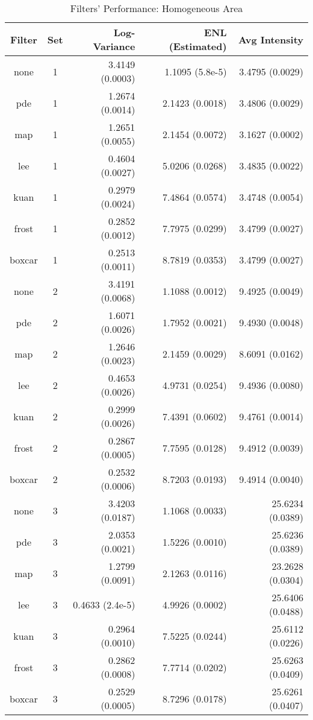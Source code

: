 \documentclass[journal]{IEEEtran}
\begin{document}
\begin{table}
\centering
\begin{tabular}{c|c|r|r|r}
Filter & Set & Log-Variance & ENL (Estimated) & Avg Intensity \\
\hline
none & 1 & 3.4149 (0.0003) & 1.1095 (5.8e-5) & 3.4795 (0.0029)\\
pde & 1 & 1.2674 (0.0014) & 2.1423 (0.0018) & 3.4806 (0.0029)\\
map & 1 & 1.2651 (0.0055) & 2.1454 (0.0072) & 3.1627 (0.0002)\\
lee & 1 & 0.4604 (0.0027) & 5.0206 (0.0268) & 3.4835 (0.0022)\\
kuan & 1 & 0.2979 (0.0024) & 7.4864 (0.0574) & 3.4748 (0.0054)\\
frost & 1 & 0.2852 (0.0012) & 7.7975 (0.0299) & 3.4799 (0.0027)\\
boxcar & 1 & 0.2513 (0.0011) & 8.7819 (0.0353) & 3.4799 (0.0027)\\
\hline
none & 2 & 3.4191 (0.0068) & 1.1088 (0.0012) & 9.4925 (0.0049)\\
pde & 2 & 1.6071 (0.0026) & 1.7952 (0.0021) & 9.4930 (0.0048)\\
map & 2 & 1.2646 (0.0023) & 2.1459 (0.0029) & 8.6091 (0.0162)\\
lee & 2 & 0.4653 (0.0026) & 4.9731 (0.0254) & 9.4936 (0.0080)\\
kuan & 2 & 0.2999 (0.0026) & 7.4391 (0.0602) & 9.4761 (0.0014)\\
frost & 2 & 0.2867 (0.0005) & 7.7595 (0.0128) & 9.4912 (0.0039)\\
boxcar & 2 & 0.2532 (0.0006) & 8.7203 (0.0193) & 9.4914 (0.0040)\\
\hline
none & 3 & 3.4203 (0.0187) & 1.1068 (0.0033) & 25.6234 (0.0389)\\
pde & 3 & 2.0353 (0.0021) & 1.5226 (0.0010) & 25.6236 (0.0389)\\
map & 3 & 1.2799 (0.0091) & 2.1263 (0.0116) & 23.2628 (0.0304)\\
lee & 3 & 0.4633 (2.4e-5) & 4.9926 (0.0002) & 25.6406 (0.0488)\\
kuan & 3 & 0.2964 (0.0010) & 7.5225 (0.0244) & 25.6112 (0.0226)\\
frost & 3 & 0.2862 (0.0008) & 7.7714 (0.0202) & 25.6263 (0.0409)\\
boxcar & 3 & 0.2529 (0.0005) & 8.7296 (0.0178) & 25.6261 (0.0407)
\end{tabular}
\caption{ Filters' Performance: Homogeneous Area }
\label{tab:homogeneous_performance_filters}
\end{table}
\end{document}
